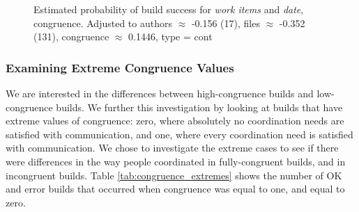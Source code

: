\begin{figure}[t]
\centering
  \caption{Estimated probability of build success for \emph{work items} and \emph{date},  congruence. Adjusted to authors $\approx$ -0.156 (17), files $\approx$ -0.352 (131), congruence $\approx$ 0.1446, type = cont}
  \label{fig:weighted_congruence_workitems_age}
\end{figure}

\subsubsection{Examining Extreme Congruence Values}
\label{sec:extremecongruence}
We are interested in the differences between high-congruence builds and low-congruence builds.
We further this investigation by looking at builds that have extreme values of congruence: zero, where absolutely no coordination needs are satisfied with communication, and one, where every coordination need is satisfied with communication.
We chose to investigate the extreme cases to see if there were differences in the way people coordinated in fully-congruent builds, and in incongruent builds.
Table \ref{tab:congruence_extremes} shows the number of OK and error builds that occurred when congruence was equal to one, and equal to zero. 


